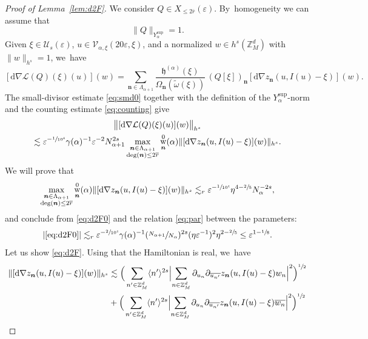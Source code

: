 \documentclass[JEP,XML,SOM,Unicode,published]{cedram}
\DeclareMathOperator{\rw}{w}
\theoremstyle{plain}
\theoremstyle{definition}
\newcommand{\nb}{{\boldsymbol n}}
\newcommand{\Z}{\mathbb{Z}}
\newcommand{\1}{\mathbf{1}}
\newcommand{\Ysup}[1]{Y_{#1}^{\mathrm{sup}}}
\let\epsilon\varepsilon
\begin{document}
\begin{proof}[Proof of Lemma~\ref{lem:d2F}]
We consider $Q\in X_{\leq2\overline{r}}(\epsilon)$. By~homogeneity we can assume that
\[
\|Q\|_{\Ysup{\alpha}}=1.
\]
Given $\xi\in\mathcal{U}_{s}(\epsilon)$, $u\in\mathcal{V}_{\alpha,\xi}(20\epsilon,\xi)$, and a normalized $w\in h^{s}(\Z_{M}^{d})$ with $\|w\|_{h^{s}}=1$, we~have
\[
[\mathrm{d}\nabla \mathcal{L}(Q)(\xi)(u)](w) = \sum_{\nb\in\Lambda_{\alpha+1}}\frac{\mathfrak{h}^{(\alpha)}(\xi)}{\Omega_{\nb}(\widetilde{\omega}(\xi))}\,(Q[\xi])_{\nb}[\mathrm{d}\nabla z_{\nb}(u,I(u)-\xi)](w).
\]
The small-divisor estimate \eqref{eq:smd0} together with the definition of the $\Ysup{\alpha}$-norm and the counting estimate \eqref{eq:counting} give
\begin{multline}
\label{eq:d2F0}
\bigl\|[\mathrm{d}\nabla \mathcal{L}(Q)(\xi)(u)](w)\bigr\|_{h^{s}}
\\
\lesssim \epsilon^{-\sfrac{1}{10^{4}}}\gamma(\alpha)^{-1}\epsilon^{-2}N_{\alpha+1}^{2s}
\max_{\substack{\nb\in\Lambda_{\alpha+1}\\ \deg(\nb)\leq 2\overline{r}}}
\rw_{\nb}^{0}(\alpha)
\|
[\mathrm{d}\nabla z_{\nb}(u,I(u)-\xi)](w)
\|_{h^{s}}.
\end{multline}
We will prove that
\begin{equation}
\label{eq:d2F}
\max_{\substack{\nb\in\Lambda_{\alpha+1}\\ \deg(\nb)\leq 2\overline{r}}}
\rw_{\nb}^{0}(\alpha)
\|
[\mathrm{d}\nabla z_{\nb}(u,I(u)-\xi)](w)
\|_{h^{s}}
\lesssim_{r}\epsilon^{-\sfrac{1}{10^{4}}}\eta^{4-\sfrac{2}{5}}N_{\alpha}^{-2s},
\end{equation}
and conclude from \eqref{eq:d2F0} and the relation \eqref{eq:par} between the parameters:
\[
|\eqref{eq:d2F0}|
\lesssim_{r}\epsilon^{-\sfrac{2}{10^{4}}}\gamma(\alpha)^{-1}
(\sfrac{N_{\alpha+1}}{N_{\alpha}})^{2s}(\eta\epsilon^{-1})^{2}\eta^{2-\sfrac{2}{5}}
\leq \epsilon^{1-\sfrac{1}{8}}.
\]
Let us show \eqref{eq:d2F}. Using that the Hamiltonian is real, we~have
\begin{align}
\nonumber
\|
[\mathrm{d}\nabla z_{\nb}(u,I(u)-\xi)](w)
\|_{h^{s}}
&\lesssim
\Big(\sum_{n'\in\Z_{M}^{d}}\langle n'\rangle^{2s}\Bigl|\sum_{n\in\Z_{M}^{d}} \partial_{u_{n}}\partial_{\overline{u_{n'}}}
z_{\nb}(u,I(u)-\xi)w_{n}\Bigr|^2
\Big)^{\sfrac{1}{2}} \\
\nonumber
&+
\Big(\sum_{n'\in\Z_{M}^{d}}\langle n'\rangle^{2s}\Bigl|\sum_{n\in\Z_{M}^{d}} \partial_{u_{n}}\partial_{\overline{u_{n'}}}
z_{\nb}(u,I(u)-\xi)\overline{w_{n}}\Bigr|^2
\Big)^{\sfrac{1}{2}} \\

\end{align}
\end{proof}
\end{document}
